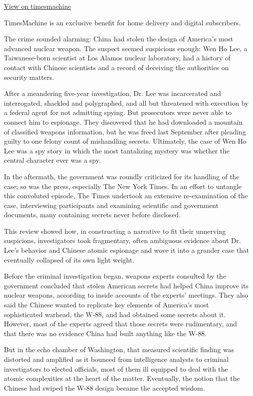 \href{http://timesmachine.nytimes3xbfgragh.onion/timesmachine/2001/02/04/760501.html}{View
on timesmachine}

TimesMachine is an exclusive benefit for home delivery and digital
subscribers.

The crime sounded alarming: China had stolen the design of America's
most advanced nuclear weapon. The suspect seemed suspicious enough: Wen
Ho Lee, a Taiwanese-born scientist at Los Alamos nuclear laboratory, had
a history of contact with Chinese scientists and a record of deceiving
the authorities on security matters.

After a meandering five-year investigation, Dr. Lee was incarcerated and
interrogated, shackled and polygraphed, and all but threatened with
execution by a federal agent for not admitting spying. But prosecutors
were never able to connect him to espionage. They discovered that he had
downloaded a mountain of classified weapons information, but he was
freed last September after pleading guilty to one felony count of
mishandling secrets. Ultimately, the case of Wen Ho Lee was a spy story
in which the most tantalizing mystery was whether the central character
ever was a spy.

In the aftermath, the government was roundly criticized for its handling
of the case; so was the press, especially The New York Times. In an
effort to untangle this convoluted episode, The Times undertook an
extensive re-examination of the case, interviewing participants and
examining scientific and government documents, many containing secrets
never before disclosed.

This review showed how, in constructing a narrative to fit their
unnerving suspicions, investigators took fragmentary, often ambiguous
evidence about Dr. Lee's behavior and Chinese atomic espionage and wove
it into a grander case that eventually collapsed of its own light
weight.

Before the criminal investigation began, weapons experts consulted by
the government concluded that stolen American secrets had helped China
improve its nuclear weapons, according to inside accounts of the
experts' meetings. They also said the Chinese wanted to replicate key
elements of America's most sophisticated warhead, the W-88, and had
obtained some secrets about it. However, most of the experts agreed that
those secrets were rudimentary, and that there was no evidence China had
built anything like the W-88.

But in the echo chamber of Washington, that measured scientific finding
was distorted and amplified as it bounced from intelligence analysts to
criminal investigators to elected officials, most of them ill equipped
to deal with the atomic complexities at the heart of the matter.
Eventually, the notion that the Chinese had swiped the W-88 design
became the accepted wisdom.

